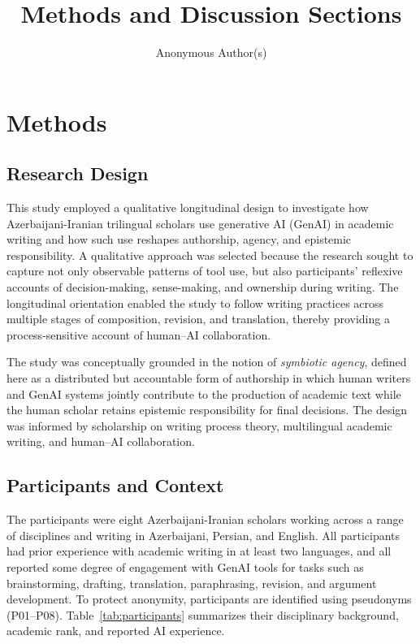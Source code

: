 \documentclass[12pt]{article}
\title{Methods and Discussion Sections}
\author{Anonymous Author(s)}
\date{}
\begin{document}
\maketitle

\section{Methods}

\subsection{Research Design}
This study employed a qualitative longitudinal design to investigate how Azerbaijani-Iranian trilingual scholars use generative AI (GenAI) in academic writing and how such use reshapes authorship, agency, and epistemic responsibility. A qualitative approach was selected because the research sought to capture not only observable patterns of tool use, but also participants' reflexive accounts of decision-making, sense-making, and ownership during writing. The longitudinal orientation enabled the study to follow writing practices across multiple stages of composition, revision, and translation, thereby providing a process-sensitive account of human--AI collaboration.

The study was conceptually grounded in the notion of \emph{symbiotic agency}, defined here as a distributed but accountable form of authorship in which human writers and GenAI systems jointly contribute to the production of academic text while the human scholar retains epistemic responsibility for final decisions. The design was informed by scholarship on writing process theory, multilingual academic writing, and human--AI collaboration.

\subsection{Participants and Context}
The participants were eight Azerbaijani-Iranian scholars working across a range of disciplines and writing in Azerbaijani, Persian, and English. All participants had prior experience with academic writing in at least two languages, and all reported some degree of engagement with GenAI tools for tasks such as brainstorming, drafting, translation, paraphrasing, revision, and argument development. To protect anonymity, participants are identified using pseudonyms (P01--P08). Table~\ref{tab:participants} summarizes their disciplinary background, academic rank, and reported AI experience.
\end{document}

